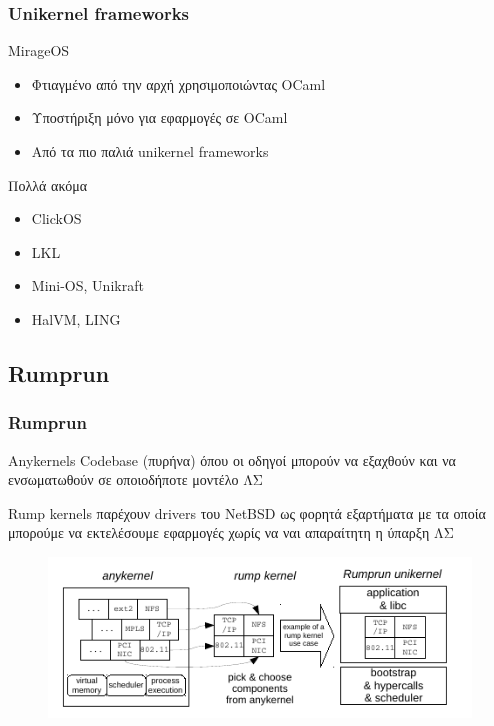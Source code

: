 \documentclass[red,slidestop,notes,compress,mathserif]{beamer}
\begin{document}
\begin{frame}
\frametitle{Unikernel frameworks}
	\begin{block}{MirageOS}
		\begin{itemize}
			\item Φτιαγμένο από την αρχή χρησιμοποιώντας OCaml
			\item Υποστήριξη μόνο για εφαρμογές σε OCaml
			\item Από τα πιο παλιά unikernel frameworks
		\end{itemize}
	\end{block}
	\pause
	\begin{block}{Πολλά ακόμα}
		\begin{itemize}
			\item ClickOS
			\item LKL
			\item Mini-OS, Unikraft
			\item HalVM, LING
		\end{itemize}
	\end{block}
\end{frame}

\subsection*{Rumprun}
\begin{frame}
\frametitle{Rumprun}
\begin{block}{Anykernels}
	Codebase (πυρήνα) όπου οι οδηγοί μπορούν να εξαχθούν και να ενσωματωθούν σε οποιοδήποτε μοντέλο ΛΣ
\end{block}
\begin{block}{Rump kernels}
	παρέχουν drivers του NetBSD ως φορητά εξαρτήματα με τα οποία μπορούμε να εκτελέσουμε εφαρμογές χωρίς να ναι απαραίτητη η ύπαρξη ΛΣ
\end{block}
\begin{figure}
\center
	\includegraphics[scale=0.5]{figures/from_anykernel_to_rump.png}
\end{figure}
\end{frame}
\end{document}
